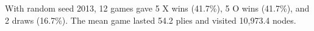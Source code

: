 With random seed 2013, 12 games gave 5 X wins (41.7\%), 5 O wins (41.7\%), and 2 draws (16.7\%). The mean game lasted 54.2 plies and visited 10,973.4 nodes.
